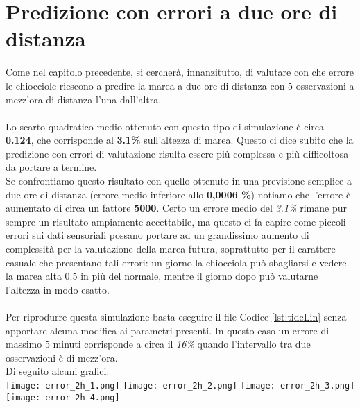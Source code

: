 	\section{Predizione con errori a due ore di distanza}
		Come nel capitolo precedente, si cercherà, innanzitutto, di valutare con che errore le chiocciole riescono a predire la marea a due ore di distanza con 5 osservazioni a mezz'ora di distanza l'una dall'altra.\\
		\\
		Lo scarto quadratico medio ottenuto con questo tipo di simulazione è circa \textbf{0.124}, che corrisponde al \textbf{3.1\%} sull'altezza di marea. Questo ci dice subito che la predizione con errori di valutazione risulta essere più complessa e più difficoltosa da portare a termine.\\
		Se confrontiamo questo risultato con quello ottenuto in una previsione semplice a due ore di distanza (errore medio inferiore allo \textbf{0,0006 \%}) notiamo che l'errore è aumentato di circa un fattore \textbf{5000}. Certo un errore medio del \textit{3.1\%} rimane pur sempre un risultato ampiamente accettabile, ma questo ci fa capire come piccoli errori sui dati sensoriali possano portare ad un grandissimo aumento di complessità per la valutazione della marea futura, soprattutto per il carattere casuale che presentano tali errori: un giorno la chiocciola può sbagliarsi e vedere la marea alta 0.5 in più del normale, mentre il giorno dopo può valutarne l'altezza in modo esatto.\\
		\\
		Per riprodurre questa simulazione basta eseguire il file Codice \ref{lst:tideLin} senza apportare alcuna modifica ai parametri presenti. In questo caso un errore di massimo 5 minuti corrisponde a circa il \textit{16\%} quando l'intervallo tra due osservazioni è di mezz'ora.\\
		Di seguito alcuni grafici:\\
		\texttt{[image: error\_2h\_1.png]}
		\texttt{[image: error\_2h\_2.png]}
		\texttt{[image: error\_2h\_3.png]}
		\texttt{[image: error\_2h\_4.png]}
		\FloatBarrier
